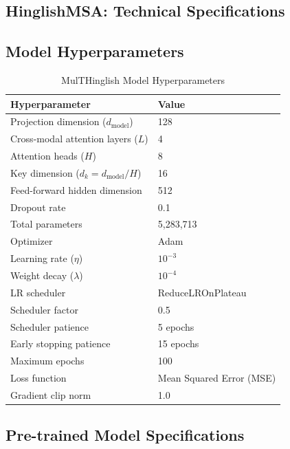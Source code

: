\begin{appendices}
    \chapter[HinglishMSA: Technical Specifications]{HinglishMSA: Technical Specifications}

    \section{Model Hyperparameters}

    \begin{table}[H]
    \centering
    \caption{MulTHinglish Model Hyperparameters}
    \begin{tabular}{ll}
    \toprule
    \textbf{Hyperparameter} & \textbf{Value} \\
    \midrule
    Projection dimension ($d_{\text{model}}$) & 128 \\
    Cross-modal attention layers ($L$) & 4 \\
    Attention heads ($H$) & 8 \\
    Key dimension ($d_k = d_{\text{model}}/H$) & 16 \\
    Feed-forward hidden dimension & 512 \\
    Dropout rate & 0.1 \\
    Total parameters & 5,283,713 \\
    \midrule
    Optimizer & Adam \\
    Learning rate ($\eta$) & $10^{-3}$ \\
    Weight decay ($\lambda$) & $10^{-4}$ \\
    LR scheduler & ReduceLROnPlateau \\
    Scheduler factor & 0.5 \\
    Scheduler patience & 5 epochs \\
    Early stopping patience & 15 epochs \\
    Maximum epochs & 100 \\
    Loss function & Mean Squared Error (MSE) \\
    Gradient clip norm & 1.0 \\
    \bottomrule
    \end{tabular}
    \end{table}

    \section{Pre-trained Model Specifications}


\end{appendices}
